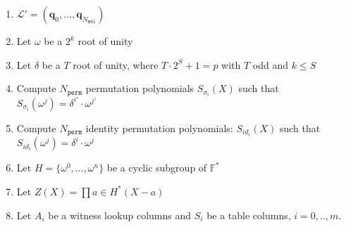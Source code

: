 \begin{algorithm}[h]
\begin{enumerate}
	\item $\mathcal{L}' = (\textbf{q}_{0}, ..., \textbf{q}_{N_{\texttt{sel}}})$
	\item Let $\omega$ be a $2^k$ root of unity
	\item Let $\delta$ be a $T$ root of unity, where $T \cdot 2^S + 1 = p$ with $T$ odd and $k \leq S$
	\item Compute $N_{\texttt{perm}}$ permutation polynomials $S_{\sigma_i}(X)$ such that $S_{\sigma_i}(\omega^j) = \delta^{i'} \cdot \omega^{j'}$
	\item Compute $N_{\texttt{perm}}$ identity permutation polynomials: $S_{id_i}(X)$ such that $S_{id_i}(\omega^j) = \delta^i \cdot \omega^j$
	\item Let $H = \{\omega^0, ..., \omega^n\}$ be a cyclic subgroup of $\mathbb{F}^*$
	\item Let $Z(X) = \prod\limits{a \in H^*}(X - a)$
	\item Let $A_i$ be a witness lookup columns and $S_i$ be a table columns, $i = 0,.., m$.
\end{enumerate}
\end{algorithm}

